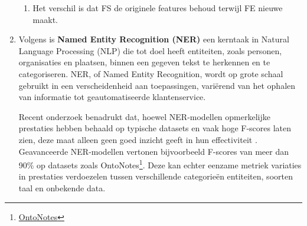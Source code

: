 \begin{enumerate}
\begin{enumerate}
        \item Het verschil is dat FS de originele features behoud terwijl FE nieuwe maakt.
    \end{enumerate}
    \item Volgens \textcite{vajjala2022reallyknowstateart} is \textbf{Named Entity Recognition (NER)} een kerntaak in Natural Language Processing (NLP) die tot doel heeft entiteiten, zoals personen, organisaties en plaatsen, binnen een gegeven tekst te herkennen en te categoriseren. NER, of Named Entity Recognition, wordt op grote schaal gebruikt in een verscheidenheid aan toepassingen, variërend van het ophalen van informatie tot geautomatiseerde klantenservice.
  
    Recent onderzoek benadrukt dat, hoewel NER-modellen opmerkelijke prestaties hebben behaald op typische datasets en vaak hoge F-scores laten zien, deze maat alleen geen goed inzicht geeft in hun effectiviteit \autocite{vajjala2022reallyknowstateart}. Geavanceerde NER-modellen vertonen bijvoorbeeld F-scores van meer dan 90\% op datasets zoals OntoNotes\footnote{\href{https://paperswithcode.com/dataset/ontonotes-5-0}{OntoNotes}}. Deze kan echter eenzame metriek variaties in prestaties verdoezelen tussen verschillende categorieën entiteiten, soorten taal en onbekende data.
\end{enumerate}


